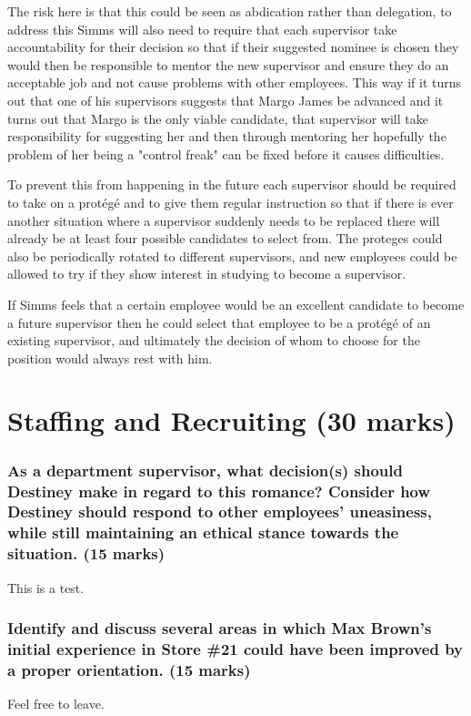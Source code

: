 \documentclass[12pt,titlepage]{article}
\begin{document}
The risk here is that this could be seen as abdication rather than delegation, to address this Simms will also need to require that each supervisor take accountability for their decision so that if their suggested nominee is chosen they would then be responsible to mentor the new supervisor and ensure they do an acceptable job and not cause problems with other employees. This way if it turns out that one of his supervisors suggests that Margo James be advanced and it turns out that Margo is the only viable candidate, that supervisor will take responsibility for suggesting her and then through mentoring her hopefully the problem of her being a "control freak" can be fixed before it causes difficulties.  

To prevent this from happening in the future each supervisor should be required to take on a protégé and to give them regular instruction so that if there is ever another situation where a supervisor suddenly needs to be replaced there will already be at least four possible candidates to select from. The proteges could also be periodically rotated to different supervisors, and new employees could be allowed to try if they show interest in studying to become a supervisor. 

If Simms feels that a certain employee would be an excellent candidate to become a future supervisor then he could select that employee to be a protégé of an existing supervisor, and ultimately the decision of whom to choose for the position would always rest with him. 

\part{Staffing and Recruiting (30 marks)}
\setcounter{section}{0}

\section{As a department supervisor, what decision(s) should Destiney make in regard to this romance? Consider how Destiney should respond to other employees' uneasiness, while still maintaining an ethical stance towards the situation. (15 marks)}

This is a test. 

\section{Identify and discuss several areas in which Max Brown's initial experience in Store \#21 could have been improved by a proper orientation. (15 marks)}

Feel free to leave.
\end{document}
